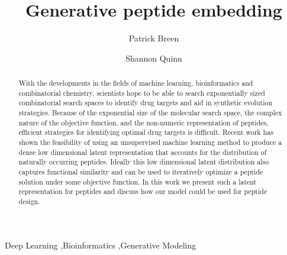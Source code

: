\documentclass[final,1p,times]{elsarticle}
\begin{document}
\begin{frontmatter}


\title{Generative peptide embedding}




\author{Patrick Breen}
\address{Institute of Bioinformatics, University of Georgia}

\author{Shannon Quinn}
\address{Department of Computer Science, University of Georgia}

\begin{abstract}
With the developments in the fields of machine learning, bioinformatics and combinatorial chemistry, scientists hope to be able to search exponentially sized combinatorial search spaces to identify drug targets and aid in synthetic evolution strategies. Because of the exponential size of the molecular search space, the complex nature of the objective function, and the non-numeric representation of peptides, efficient strategies for identifying optimal drug targets is difficult. Recent work has shown the feasibility of using an unsupervised machine learning method to produce a dense low dimensional latent representation that accounts for the distribution of naturally occurring peptides. Ideally this low dimensional latent distribution also captures functional similarity and can be used to iteratively optimize a peptide solution under some objective function. In this work we present such a latent representation for peptides and discuss how our model could be used for peptide design.
\end{abstract}

\begin{keyword}
Deep Learning \sep Bioinformatics \sep Generative Modeling


\end{keyword}

\end{frontmatter}
\end{document}
